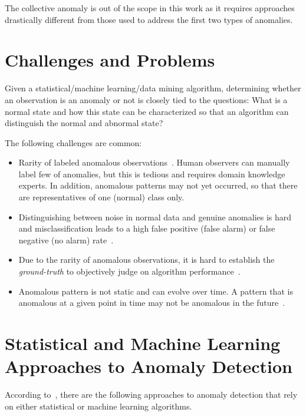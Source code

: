 The collective anomaly is out of the scope in this work as it requires approaches drastically different from those used to address the first two types of anomalies.

\section{Challenges and Problems}\label{challenges}
Given a statistical/machine learning/data mining algorithm, determining whether an observation is an anomaly or not is closely tied to the questions: What is a normal state and how this state can be characterized so that an algorithm can distinguish the normal and abnormal state? 

The following challenges are common:
\begin{itemize}
    \item Rarity of labeled anomalous observations~\cite{Weiss:2004:MRU:1007730.1007734}. Human observers can manually label few of anomalies, but this is tedious and requires domain knowledge experts. In addition, anomalous patterns may not yet occurred, so that there are representatives of one (normal) class only.
    
    \item Distinguishing between noise in normal data and genuine anomalies is hard and misclassification leads to a high false positive (false alarm)  or false negative  (no alarm) rate~\cite{Chandola:2009:ADS:1541880.1541882}.   %

    \item Due to the rarity of anomalous observations, it is hard to establish the \textit{ground-truth} to objectively judge on algorithm performance~\cite{Aggarwal:2013}. %
    
    \item Anomalous pattern is not static and can evolve over time. A pattern that is anomalous at a given point in time may not be anomalous in the future~\cite{Chandola:2009:ADS:1541880.1541882}.
\end{itemize}

\section{Statistical and Machine Learning Approaches to Anomaly Detection}\label{approaches2problem}
According to~\cite{Aggarwal:2013}, there are the following approaches to anomaly detection that rely on either statistical or machine learning algorithms.

